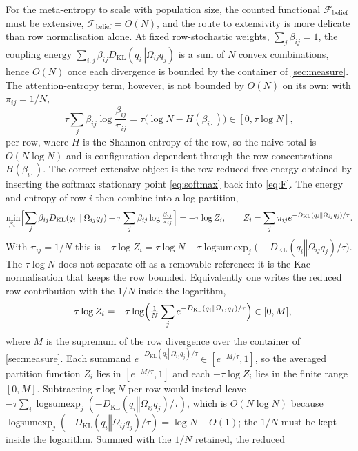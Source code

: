 \documentclass[11pt]{article}
\theoremstyle{plain}
\theoremstyle{definition}
\newcommand{\KL}[2]{D_{\mathrm{KL}}\mathopen{}\left(#1 \mathbin{\Vert} #2\right)\mathclose{}}
\newcommand{\Fcal}{\mathcal{F}}
\newcommand{\Omegaij}{\Omega_{ij}}
\newcommand{\betaij}{\beta_{ij}}
\begin{document}
For the meta-entropy to scale with population size, the counted functional
$\Fcal_{\mathrm{belief}}$ must be extensive, $\Fcal_{\mathrm{belief}}=O(N)$, and the route to
extensivity is more delicate than row normalisation alone. At fixed row-stochastic weights, $\sum_j\betaij=1$, the coupling energy
$\sum_{i,j}\betaij \KL{q_i}{\Omegaij q_j}$ is a sum of $N$ convex combinations, hence
$O(N)$ once each divergence is bounded by the container of \cref{sec:measure}. The
attention-entropy term, however, is not bounded by $O(N)$ on its own: with $\pi_{ij}=1/N$,
\begin{equation}
\tau\sum_{j}\betaij\log\frac{\betaij}{\pi_{ij}}
=\tau\bigl(\log N-H(\beta_{i\cdot})\bigr)\in[0,\tau\log N],
\end{equation}
per row, where $H$ is the Shannon entropy of the row, so the naive total is
$O(N\log N)$ and is configuration dependent through the row concentrations $H(\beta_{i\cdot})$.
The correct extensive object is the row-reduced free energy obtained by inserting the
softmax stationary point \cref{eq:softmax} back into \cref{eq:F}. The energy and entropy
of row $i$ then combine into a log-partition,
\begin{equation}
\label{eq:rowfree}
\min_{\beta_{i\cdot}}\Bigl[\sum_j\betaij\KL{q_i}{\Omegaij q_j}+\tau\sum_j\betaij\log\tfrac{\betaij}{\pi_{ij}}\Bigr]
=-\tau\log Z_i,\qquad
Z_i=\sum_j\pi_{ij} e^{-\KL{q_i}{\Omegaij q_j}/\tau}.
\end{equation}
With $\pi_{ij}=1/N$ this is
$-\tau\log Z_i=\tau\log N-\tau\operatorname{logsumexp}_j\bigl(-\KL{q_i}{\Omegaij q_j}/\tau\bigr)$.
The $\tau\log N$ does not separate off as a removable reference: it is the Kac
normalisation that keeps the row bounded. Equivalently one writes the reduced row
contribution with the $1/N$ inside the logarithm,
\begin{equation}
\label{eq:rowkac}
-\tau\log Z_i=-\tau\log\Bigl(\tfrac1N\sum_j e^{-\KL{q_i}{\Omegaij q_j}/\tau}\Bigr)\in[0,M],
\end{equation}
where $M$ is the supremum of the row divergence over the container of \cref{sec:measure}.
Each summand $e^{-\KL{q_i}{\Omegaij q_j}/\tau}\in[e^{-M/\tau},1]$, so the averaged
partition function $Z_i$ lies in $[e^{-M/\tau},1]$ and each $-\tau\log Z_i$ lies in the
finite range $[0,M]$. Subtracting $\tau\log N$ per row would instead leave
$-\tau\sum_i\operatorname{logsumexp}_j(-\KL{q_i}{\Omegaij q_j}/\tau)$, which is
$O(N\log N)$ because $\operatorname{logsumexp}_j(-\KL{q_i}{\Omegaij q_j}/\tau)=\log N+O(1)$;
the $1/N$ must be kept inside the logarithm. Summed with the $1/N$ retained, the reduced
\end{document}
